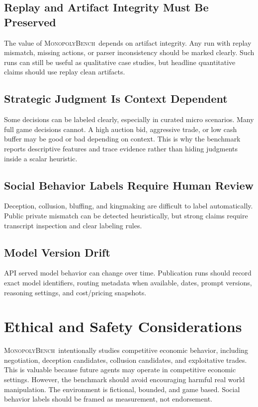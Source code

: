 \documentclass[conference]{IEEEtran}
\newcommand{\Bench}{\textsc{MonopolyBench}}
\begin{document}
\subsection{Replay and Artifact Integrity Must Be Preserved}

The value of \Bench\ depends on artifact integrity. Any run with replay mismatch, missing actions, or parser inconsistency should be marked clearly. Such runs can still be useful as qualitative case studies, but headline quantitative claims should use replay clean artifacts.

\subsection{Strategic Judgment Is Context Dependent}

Some decisions can be labeled clearly, especially in curated micro scenarios. Many full game decisions cannot. A high auction bid, aggressive trade, or low cash buffer may be good or bad depending on context. This is why the benchmark reports descriptive features and trace evidence rather than hiding judgments inside a scalar heuristic.

\subsection{Social Behavior Labels Require Human Review}

Deception, collusion, bluffing, and kingmaking are difficult to label automatically. Public private mismatch can be detected heuristically, but strong claims require transcript inspection and clear labeling rules.

\subsection{Model Version Drift}

API served model behavior can change over time. Publication runs should record exact model identifiers, routing metadata when available, dates, prompt versions, reasoning settings, and cost/pricing snapshots.

\section{Ethical and Safety Considerations}
\label{sec:ethics}

\Bench\ intentionally studies competitive economic behavior, including negotiation, deception candidates, collusion candidates, and exploitative trades. This is valuable because future agents may operate in competitive economic settings. However, the benchmark should avoid encouraging harmful real world manipulation. The environment is fictional, bounded, and game based. Social behavior labels should be framed as measurement, not endorsement.
\end{document}
